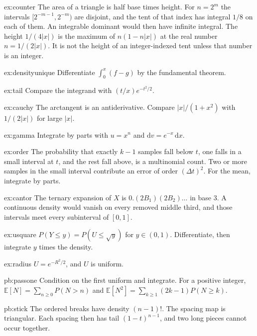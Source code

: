 \begin{hint}{ex:counter}
The area of a triangle is half base times height. For $n=2^m$ the intervals $[2^{-m-1},2^{-m})$ are disjoint, and the tent of that index has integral $1/8$ on each of them. An integrable dominant would then have infinite integral. The height $1/(4|x|)$ is the maximum of $n(1-n|x|)$ at the real number $n=1/(2|x|)$. It is not the height of an integer-indexed tent unless that number is an integer.
\end{hint}
\begin{hint}{ex:densityunique}
Differentiate $\int_0^x(f-g)$ by the fundamental theorem.
\end{hint}
\begin{hint}{ex:tail}
Compare the integrand with $(t/x)e^{-t^2/2}$.
\end{hint}
\begin{hint}{ex:cauchy}
The arctangent is an antiderivative. Compare $|x|/(1+x^2)$ with $1/(2|x|)$ for large $|x|$.
\end{hint}
\begin{hint}{ex:gamma}
Integrate by parts with $u=x^n$ and $\mathrm dv=e^{-x}\,\mathrm dx$.
\end{hint}
\begin{hint}{ex:order}
The probability that exactly $k-1$ samples fall below $t$, one falls in a small interval at $t$, and the rest fall above, is a multinomial count. Two or more samples in the small interval contribute an error of order $(\Delta t)^2$. For the mean, integrate by parts.
\end{hint}
\begin{hint}{ex:cantor}
The ternary expansion of $X$ is $0.(2B_1)(2B_2)\ldots$ in base $3$. A continuous density would vanish on every removed middle third, and those intervals meet every subinterval of $[0,1]$.
\end{hint}
\begin{hint}{ex:usquare}
$P(Y\le y)=P(U\le\sqrt y)$ for $y\in(0,1)$. Differentiate, then integrate $y$ times the density.
\end{hint}
\begin{hint}{ex:radius}
$U=e^{-R^2/2}$, and $U$ is uniform.
\end{hint}


\begin{hint}{pb:passone}
Condition on the first uniform and integrate. For a positive integer, $\mathbb E[N]=\sum_{n\ge0}P(N>n)$ and $\mathbb E[N^2]=\sum_{k\ge1}(2k-1)P(N\ge k)$.
\end{hint}
\begin{hint}{pb:stick}
The ordered breaks have density $(n-1)!$. The spacing map is triangular. Each spacing then has tail $(1-t)^{n-1}$, and two long pieces cannot occur together.
\end{hint}

